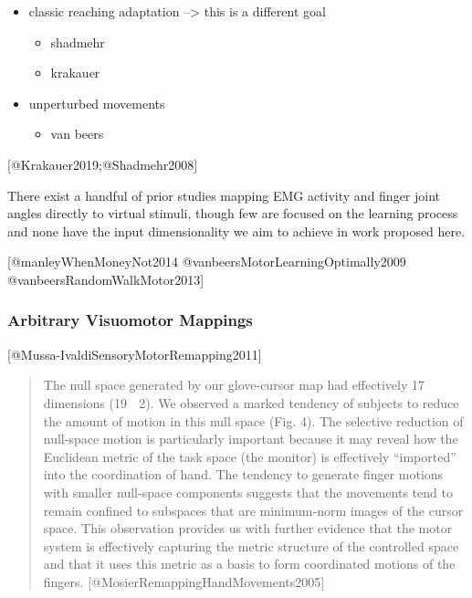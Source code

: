 \begin{itemize}
\tightlist
\item
  classic reaching adaptation --\textgreater{} this is a different goal

  \begin{itemize}
  \tightlist
  \item
    shadmehr
  \item
    krakauer
  \end{itemize}
\item
  unperturbed movements

  \begin{itemize}
  \tightlist
  \item
    van beers
  \end{itemize}
\end{itemize}

{[}@Krakauer2019;@Shadmehr2008{]}

There exist a handful of prior studies mapping EMG activity and finger
joint angles directly to virtual stimuli, though few are focused on the
learning process and none have the input dimensionality we aim to
achieve in work proposed here.

{[}@manleyWhenMoneyNot2014 @vanbeersMotorLearningOptimally2009
@vanbeersRandomWalkMotor2013{]}

\subsubsection{Arbitrary Visuomotor
Mappings}\label{arbitrary-visuomotor-mappings}

{[}@Mussa-IvaldiSensoryMotorRemapping2011{]}

\begin{quote}
The null space generated by our glove-cursor map had effectively 17
dimensions (19 􏰇 2). We observed a marked tendency of subjects to reduce
the amount of motion in this null space (Fig. 4). The selective
reduction of null-space motion is particularly important because it may
reveal how the Euclidean metric of the task space (the monitor) is
effectively ``imported'' into the coordination of hand. The tendency to
generate finger motions with smaller null-space components suggests that
the movements tend to remain confined to subspaces that are minimum-norm
images of the cursor space. This observation provides us with further
evidence that the motor system is effectively capturing the metric
structure of the controlled space and that it uses this metric as a
basis to form coordinated motions of the fingers.
{[}@MosierRemappingHandMovements2005{]}
\end{quote}

